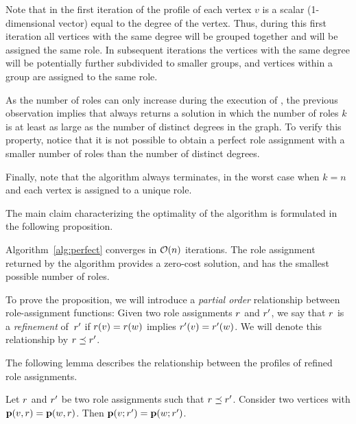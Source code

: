 Note that in the first iteration of \algperfect
the profile of each vertex $v$ is a scalar (1-dimensional vector) 
equal to the degree of the vertex.
Thus, during this first iteration
all vertices with the same degree will be grouped together and will be assigned the same role. 
In subsequent iterations the vertices with the same degree
will be potentially further subdivided to smaller groups, 
and vertices within a group are assigned to the same role. 

As the number of roles can only increase during the execution of \algperfect, 
the previous observation implies that \algperfect 
always returns a solution in which the number of roles $k$ is
at least as large as the number of distinct degrees in the graph. 
To verify this property, 
notice that it is not possible to obtain a perfect role assignment
with a smaller number of roles than the number of distinct degrees. 

Finally, note that the \algperfect algorithm always terminates, 
in the worst case when $k=n$ and each vertex is assigned to a unique role.

The main claim characterizing the optimality of the \algperfect algorithm
is formulated in the following proposition.

\iffalse
\begin{proposition}
\label{prop:perfectcorrect}
Algorithm~\ref{alg:perfect} converges in $\bigO{n}$ iterations. 
The role assignment returned by the algorithm  
provides a zero-cost solution, 
and has the smallest possible number of roles.
\end{proposition}

To prove the proposition, we will introduce a \emph{partial order} 
relationship between 
role-assignment functions:  
Given two role assignments $r$ and $r'$, we say that $r$ is a
\emph{refinement} of~$r'$ if $r(v) = r(w)$ implies $r'(v) =
r'(w)$. We will denote this relationship by $r \preceq r'$.

The following lemma describes the relationship between the profiles of refined role assignments.

\begin{lemma}
\label{lem:refineprofile}
Let $r$ and $r'$ be two role assignments such that $r \preceq r'$.
Consider two vertices %
with $\prof{v, \role} = \prof{w, \role}$. 
Then $\prof{v; \role'} = \prof{w; \role'}$.
\end{lemma}


